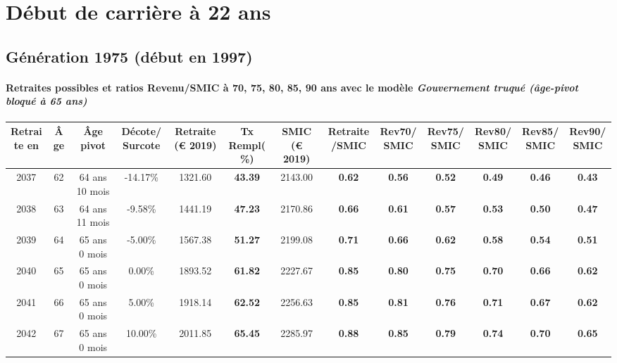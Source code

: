 \section{Début de carrière à 22 ans} 

\subsection{Génération 1975 (début en 1997)} 

\paragraph{Retraites possibles et ratios Revenu/SMIC à 70, 75, 80, 85, 90 ans avec le modèle \emph{Gouvernement truqué (âge-pivot bloqué à 65 ans)}}  
 
{ \scriptsize \begin{center} 
\begin{tabular}[htb]{|c|c||c|c||c|c||c||c|c|c|c|c|c|} 
\hline 
 Retraite en &  Âge &  Âge pivot &  Décote/Surcote &  Retraite (\euro{} 2019) &  Tx Rempl(\%) &  SMIC (\euro{} 2019) &  Retraite/SMIC &  Rev70/SMIC &  Rev75/SMIC &  Rev80/SMIC &  Rev85/SMIC &  Rev90/SMIC \\ 
\hline \hline 
 2037 &  62 &  64 ans 10 mois &  -14.17\% &  1321.60 &  {\bf 43.39} &  2143.00 &  {\bf {\color{red} 0.62}} &  {\bf {\color{red} 0.56}} &  {\bf {\color{red} 0.52}} &  {\bf {\color{red} 0.49}} &  {\bf {\color{red} 0.46}} &  {\bf {\color{red} 0.43}} \\ 
\hline 
 2038 &  63 &  64 ans 11 mois &  -9.58\% &  1441.19 &  {\bf 47.23} &  2170.86 &  {\bf {\color{red} 0.66}} &  {\bf {\color{red} 0.61}} &  {\bf {\color{red} 0.57}} &  {\bf {\color{red} 0.53}} &  {\bf {\color{red} 0.50}} &  {\bf {\color{red} 0.47}} \\ 
\hline 
 2039 &  64 &  65 ans 0 mois &  -5.00\% &  1567.38 &  {\bf 51.27} &  2199.08 &  {\bf {\color{red} 0.71}} &  {\bf {\color{red} 0.66}} &  {\bf {\color{red} 0.62}} &  {\bf {\color{red} 0.58}} &  {\bf {\color{red} 0.54}} &  {\bf {\color{red} 0.51}} \\ 
\hline 
 2040 &  65 &  65 ans 0 mois &  0.00\% &  1893.52 &  {\bf 61.82} &  2227.67 &  {\bf {\color{red} 0.85}} &  {\bf {\color{red} 0.80}} &  {\bf {\color{red} 0.75}} &  {\bf {\color{red} 0.70}} &  {\bf {\color{red} 0.66}} &  {\bf {\color{red} 0.62}} \\ 
\hline 
 2041 &  66 &  65 ans 0 mois &  5.00\% &  1918.14 &  {\bf 62.52} &  2256.63 &  {\bf {\color{red} 0.85}} &  {\bf {\color{red} 0.81}} &  {\bf {\color{red} 0.76}} &  {\bf {\color{red} 0.71}} &  {\bf {\color{red} 0.67}} &  {\bf {\color{red} 0.62}} \\ 
\hline 
 2042 &  67 &  65 ans 0 mois &  10.00\% &  2011.85 &  {\bf 65.45} &  2285.97 &  {\bf {\color{red} 0.88}} &  {\bf {\color{red} 0.85}} &  {\bf {\color{red} 0.79}} &  {\bf {\color{red} 0.74}} &  {\bf {\color{red} 0.70}} &  {\bf {\color{red} 0.65}} \\ 
\hline 
\hline 
\end{tabular} 
\end{center} } 
